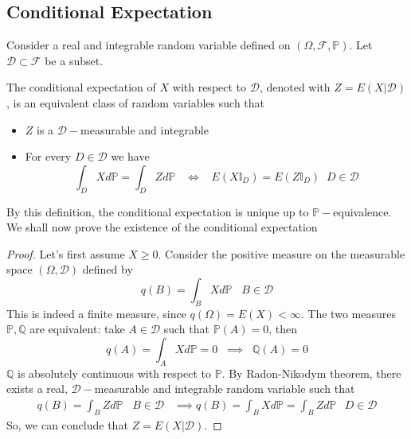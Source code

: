 \subsection{Conditional Expectation}
Consider a real and integrable random variable defined on $(\Omega, \mathcal{F}, \mathbb{P})$. Let $\mathcal{D} \subset \mathcal{F}$ be a subset. 

\begin{definition}
    The conditional expectation of $X$ with respect to $\mathcal{D}$, denoted with $Z = E(X \vert \mathcal{D})$, is an equivalent class of random variables such that 
    \begin{itemize}
        \item $Z$ is a $\mathcal{D}-$measurable and integrable
        \item For every $D \in \mathcal{D}$ we have 
        \begin{equation*}
            \int_D X d\mathbb{P} = \int_{D} Z d \mathbb{P} \;\;\; \iff \;\;\; E(X \mathbb{I}_D) = E(Z \mathbb{I}_D) \;\; D \in \mathcal{D}
        \end{equation*}
    \end{itemize}
\end{definition}

By this definition, the conditional expectation is unique up to $\mathbb{P}-$equivalence. We shall now prove the existence of the conditional expectation

\begin{proof}
    Let's first assume $X \geq 0$. Consider the positive measure on the measurable space $(\Omega,\mathcal{D})$ defined by
    \begin{equation}
        q(B) = \int_B X d\mathbb{P} \;\;\; B \in \mathcal{D}
    \end{equation}
    This is indeed a finite measure, since $q(\Omega) = E(X) < \infty$. The two measures $\mathbb{P},\mathbb{Q}$ are equivalent: take $A \in \mathcal{D}$ such that $\mathbb{P}(A) = 0$, then
    \begin{equation*}
        q(A) = \int_{A} X d\mathbb{P} = 0 \;\; \implies \;\; \mathbb{Q}(A) = 0
    \end{equation*}
    $\mathbb{Q}$ is absolutely continuous with respect to $\mathbb{P}$. By Radon-Nikodym theorem, there exists a real, $\mathcal{D}-$measurable and integrable random variable such that 
    \begin{gather*}
        q(B) = \int_B Z d\mathbb{P} \;\;\; B \in \mathcal{D} \;\;\; \implies q(B) = \int_B X d\mathbb{P} = \int_B Z d\mathbb{P} \;\:\: D \in \mathcal{D}
    \end{gather*}
    So, we can conclude that $Z = E(X \vert \mathcal{D})$. 
\end{proof}


